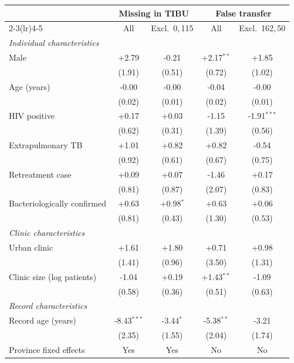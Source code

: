 \begin{tabular}{l c c c c}
\toprule
 & \multicolumn{2}{c}{Missing in TIBU} & \multicolumn{2}{c}{False transfer} \\
\cmidrule(lr){2-3}\cmidrule(lr){4-5}
 & All & Excl.\ 0,\,115 & All & Excl.\ 162,\,50 \\
\midrule
\textit{Individual characteristics} & & & & \\
\quad Male & +2.79 & -0.21 & +2.17$^{**}$ & +1.85 \\
           & (1.91) & (0.51) & (0.72) & (1.02) \\
\addlinespace[3pt]
\quad Age (years) & -0.00 & -0.00 & -0.04 & -0.00 \\
           & (0.02) & (0.01) & (0.02) & (0.01) \\
\addlinespace[3pt]
\quad HIV positive & +0.17 & +0.03 & -1.15 & -1.91$^{***}$ \\
           & (0.62) & (0.31) & (1.39) & (0.56) \\
\addlinespace[3pt]
\quad Extrapulmonary TB & +1.01 & +0.82 & +0.82 & -0.54 \\
           & (0.92) & (0.61) & (0.67) & (0.75) \\
\addlinespace[3pt]
\quad Retreatment case & +0.09 & +0.07 & -1.46 & +0.17 \\
           & (0.81) & (0.87) & (2.07) & (0.83) \\
\addlinespace[3pt]
\quad Bacteriologically confirmed & +0.63 & +0.98$^{*}$ & +0.63 & +0.06 \\
           & (0.81) & (0.43) & (1.30) & (0.53) \\
\addlinespace[3pt]
\addlinespace[2pt]
\textit{Clinic characteristics} & & & & \\
\quad Urban clinic & +1.61 & +1.80 & +0.71 & +0.98 \\
           & (1.41) & (0.96) & (3.50) & (1.31) \\
\addlinespace[3pt]
\quad Clinic size (log patients) & -1.04 & +0.19 & +1.43$^{**}$ & -1.09 \\
           & (0.58) & (0.36) & (0.51) & (0.63) \\
\addlinespace[3pt]
\addlinespace[2pt]
\textit{Record characteristics} & & & & \\
\quad Record age (years) & -8.43$^{***}$ & -3.44$^{*}$ & -5.38$^{**}$ & -3.21 \\
           & (2.35) & (1.55) & (2.04) & (1.74) \\
\addlinespace[3pt]
\midrule
Province fixed effects & Yes & Yes & No & No \\

\end{tabular}
